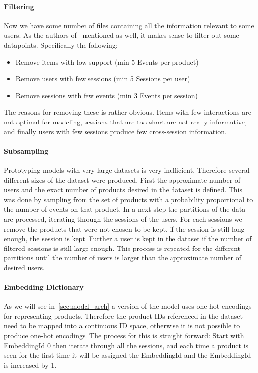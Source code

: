 \paragraph{Filtering}
Now we have some number of files containing all the information relevant to some users.
As the authors of~\cite{hierarchical} mentioned as well, it makes sense to filter out some datapoints.
Specifically the following:
\begin{itemize}
    \item Remove items with low support (min 5 Events per product)
    \item Remove users with few sessions (min 5 Sessions per user)
    \item Remove sessions with few events (min 3 Events per session)
\end{itemize}
The reasons for removing these is rather obvious.
Items with few interactions are not optimal for modeling, sessions that are too short are not really informative, and finally users with few sessions produce few cross-session information.

\paragraph{Subsampling}
Prototyping models with very large datasets is very inefficient.
Therefore several different sizes of the dataset were produced.
First the approximate number of users and the exact number of products desired in the dataset is defined.
This was done by sampling from the set of products with a probability proportional to the number of events on that product.
In a next step the partitions of the data are processed, iterating through the sessions of the users.
For each sessions we remove the products that were not chosen to be kept, if the session is still long enough, the session is kept.
Further a user is kept in the dataset if the number of filtered sessions is still large enough.
This process is repeated for the different partitions until the number of users is larger than the approximate number of desired users.

\paragraph{Embedding Dictionary}\label{sec:embedding_dict}
As we will see in~\ref{sec:model_arch} a version of the model uses one-hot encodings for representing products.
Therefore the product IDs referenced in the dataset need to be mapped into a continuous ID space, otherwise it is not possible to produce one-hot encodings.
The process for this is straight forward: Start with EmbeddingId 0 then iterate through all the sessions, and each time a product is seen for the first time it will be assigned the EmbeddingId and the EmbeddingId is increased by 1.

